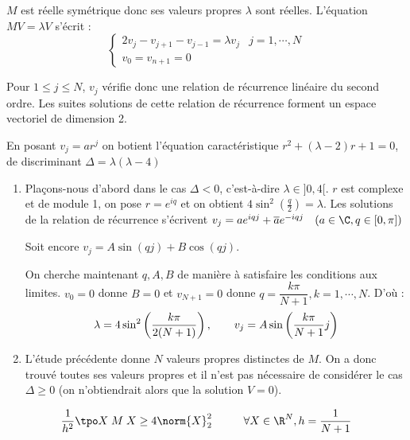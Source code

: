 \begin{preuve}
    $M$ est réelle symétrique donc ses valeurs propres $\lambda$ sont réelles.
    L'équation $MV = \lambda V$ s'écrit :
    \[
        \left\lbrace
        \begin{array}{cc}
            2 v_j - v_{j+1} - v_{j-1} = \lambda v_j & j=1,\cdots,N \\
            v_0 = v_{n+1} = 0
        \end{array}
        \right.
    \]

    Pour $1 \leq j \leq N$, $v_j$ vérifie donc une relation de récurrence linéaire
    du second ordre.
    Les suites solutions de cette relation de récurrence forment un espace
    vectoriel de dimension 2.

    En posant $v_j = ar^j$ on botient l'équation caractéristique
    $r^2 + (\lambda-2) r + 1 = 0$, de discriminant $\Delta = \lambda(\lambda - 4)$

    \begin{enumerate}[label=•]
        \item Plaçons-nous d'abord dans le cas $\Delta < 0$, c'est-à-dire
        $\lambda \in ]0,4[$. $r$ est complexe et de module 1, on pose $r = e^{iq}$
            et on obtient $4 \sin^2 \left(\frac{q}{2}\right) = \lambda$.
            Les solutions de la relation de récurrence s'écrivent
            $v_j = a e^{iqj} + \overline{a} e^{-iqj} \hspace{10pt} (a \in \C, q \in [0,\pi])$

            Soit encore $v_j = A \sin(qj) + B \cos(qj)$.

            On cherche maintenant $q,A,B$ de manière à satisfaire les conditions aux limites.
            $v_0 = 0$ donne $B = 0$ et $v_{N+1} = 0$ donne $q = \dfrac{k\pi}{N+1}, k = 1,\cdots,N$. D'où :
            \[
                \lambda = 4 \sin^2 \left( \frac{k \pi}{2(N+1)} \right),
                \hspace{0.7cm} v_j = A\sin\left( \frac{k\pi}{N+1}j \right)
            \]

        \item L'étude précédente donne $N$ valeurs propres distinctes de $M$.
            On a donc trouvé toutes ses valeurs propres et il n'est pas
            nécessaire de considérer le cas $\Delta \geq 0$ (on n'obtiendrait
            alors que la solution $V = 0$).
    \end{enumerate}
\end{preuve}

\begin{lemme}
    \[
        \frac{1}{h^2} \tpo X \; M \; X \geq 4 \norm{X}_2^2 \hspace{1cm} \forall X \in \R^N, h = \frac{1}{N+1}
    \]
    \label{lemme:1-pbvp-lemme2}
\end{lemme}

